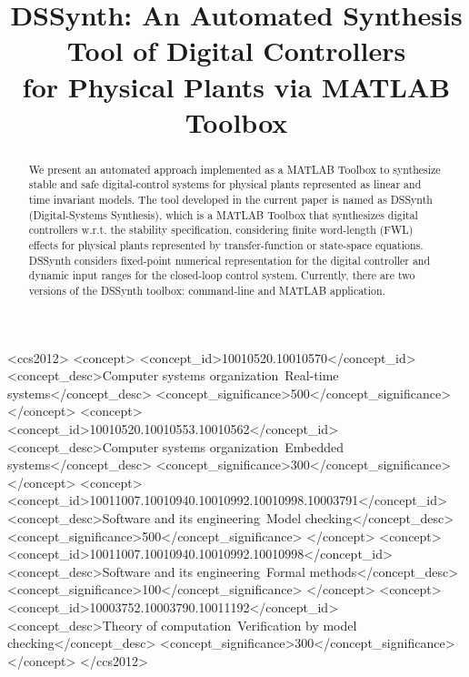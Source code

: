 \documentclass[sigconf]{acmart}
\begin{document}
\title{DSSynth: An Automated Synthesis Tool of Digital Controllers \\ for Physical Plants via MATLAB Toolbox}

\begin{abstract}
We present an automated approach implemented as a MATLAB Toolbox to synthesize stable and safe digital-control systems for physical plants represented as linear and time invariant models. The tool developed in the current paper is named as DSSynth (Digital-Systems Synthesis), which is a MATLAB Toolbox that synthesizes digital controllers w.r.t. the stability specification, considering finite word-length (FWL) effects for physical plants represented by transfer-function or state-space equations. DSSynth considers fixed-point numerical representation for the digital controller and dynamic input ranges for the closed-loop control system. Currently, there are two versions of the DSSynth toolbox: command-line and MATLAB application.
\end{abstract}

%
%
\begin{CCSXML}
<ccs2012>
<concept>
<concept_id>10010520.10010570</concept_id>
<concept_desc>Computer systems organization~Real-time systems</concept_desc>
<concept_significance>500</concept_significance>
</concept>
<concept>
<concept_id>10010520.10010553.10010562</concept_id>
<concept_desc>Computer systems organization~Embedded systems</concept_desc>
<concept_significance>300</concept_significance>
</concept>
<concept>
<concept_id>10011007.10010940.10010992.10010998.10003791</concept_id>
<concept_desc>Software and its engineering~Model checking</concept_desc>
<concept_significance>500</concept_significance>
</concept>
<concept>
<concept_id>10011007.10010940.10010992.10010998</concept_id>
<concept_desc>Software and its engineering~Formal methods</concept_desc>
<concept_significance>100</concept_significance>
</concept>
<concept>
<concept_id>10003752.10003790.10011192</concept_id>
<concept_desc>Theory of computation~Verification by model checking</concept_desc>
<concept_significance>300</concept_significance>
</concept>
</ccs2012>
\end{CCSXML}

\end{document}
